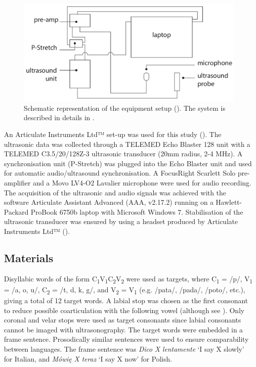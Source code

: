 \documentclass[authoryear, twocolumn]{elsarticle}
\begin{document}
\label{s:equipment}

\begin{figure}
    \centering
    \includegraphics[width=.7\textwidth]{../../graphics/uti-setup.pdf}
    \caption{Schematic representation of the equipment setup (\citealt{articulate2011}). The system is described in details in .}
    \label{f:uti-setup}
\end{figure}

An Articulate Instruments Ltd™ set-up was used for this study
(). The ultrasonic data was collected through a
TELEMED Echo Blaster 128 unit with a TELEMED C3.5/20/128Z-3 ultrasonic
transducer (20mm radius, 2-4 MHz). A synchronisation unit (P-Stretch)
was plugged into the Echo Blaster unit and used for automatic
audio/ultrasound synchronisation. A FocusRight Scarlett Solo
pre-amplifier and a Movo LV4-O2 Lavalier microphone were used for audio
recording. The acquisition of the ultrasonic and audio signals was
achieved with the software Articulate Assistant Advanced (AAA, v2.17.2)
running on a Hawlett-Packard ProBook 6750b laptop with Microsoft Windows
7. Stabilisation of the ultrasonic transducer was ensured by using a
headset produced by Articulate Instruments Ltd™
(\citeyear{articulate2008}).

\subsection{Materials}\label{materials}

Disyllabic words of the form
C\textsubscript{1}V\textsubscript{1}C\textsubscript{2}V\textsubscript{2}
were used as targets, where C\textsubscript{1} = /p/, V\textsubscript{1}
= /a, o, u/, C\textsubscript{2} = /t, d, k, g/, and V\textsubscript{2} =
V\textsubscript{1} (e.g. /pata/, /pada/, /poto/, etc.), giving a total
of 12 target words. A labial stop was chosen as the first consonant to
reduce possible coarticulation with the following vowel (although see
\citealt{vazquez-alvarez2007}). Only coronal and velar stops were used
as target consonants since labial consonants cannot be imaged with
ultrasonography. The target words were embedded in a frame sentence.
Prosodically similar sentences were used to ensure comparability between
languages. The frame sentence was \emph{Dico X lentamente} `I say X
slowly' for Italian, and \emph{Mówię X teraz} `I say X now' for Polish.
\end{document}
